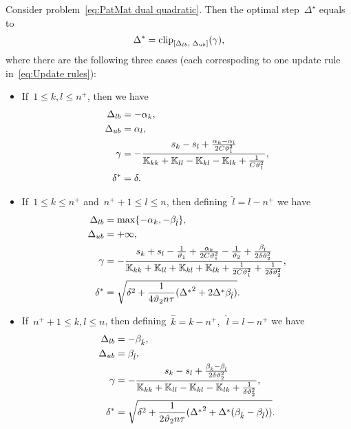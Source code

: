 \begin{theorem}\label{thm:Update rule PatMat with quadratic loss}
  Consider problem~\eqref{eq:PatMat dual quadratic}. Then the optimal step~$\Delta^\star$ equals to
  \begin{equation}\label{eq:Delta_optimal2}
    \Delta^{*} = \clip{\Delta_{lb}}{\Delta_{ub}}{\gamma},
  \end{equation}
  where there are the following three cases (each correspoding to one update rule in~\eqref{eq:Update rules}):
  \begin{itemize}
    \item If~$1\le k, l \le n^+$, then we have
    \begin{align*}
      \Delta_{lb} & = -\alpha_k, \\
      \Delta_{ub} & = \alpha_l, \\
      \gamma      & = -\frac{s_k - s_l + \frac{\alpha_k - \alpha_l}{2C\vartheta_1^2}}{\mathbb{K}_{kk} + \mathbb{K}_{ll} - \mathbb{K}_{kl} - \mathbb{K}_{lk} + \frac{1}{C\vartheta_1^2}}, \\
      \delta^{*}  & = \delta.
    \end{align*}
    \item If~$1 \le k \le n^+$ and~$n^+ + 1 \le l \le n$, then defining~$\hat{l} = l - n^+$ we have
    \begin{align*}
      \Delta_{lb} & = \max\{- \alpha_k, - \beta_{\hat{l}}\}, \\
      \Delta_{ub} & = +\infty, \\
      \gamma      & = -\frac{s_k + s_l  - \frac{1}{\vartheta_1} + \frac{\alpha_k}{2C\vartheta_1^2} - \frac{1}{\vartheta_2} + \frac{\beta_{\hat{l}}}{2\delta\vartheta_2^2}}{\mathbb{K}_{kk} + \mathbb{K}_{ll} + \mathbb{K}_{kl} + \mathbb{K}_{lk} + \frac{1}{2C\vartheta_1^2} + \frac{1}{2\delta\vartheta_2^2}}, \\
      \delta^{*}  & = \sqrt{\delta^2 + \frac{1}{4 \vartheta_2 n \tau}({\Delta^{*}}^2 + 2 \Delta^{*} \beta_{\hat{l}})}.
    \end{align*}
    \item If~$n^+ + 1\le k,l \le n$, then defining~$\hat{k} = k - n^+,$~$\hat{l} = l - n^+$ we have
    \begin{align*}
      \Delta_{lb} & = - \beta_{\hat{k}}, \\
      \Delta_{ub} & = \beta_{\hat{l}}, \\
      \gamma      & = -\frac{s_k - s_l + \frac{\beta_{\hat{k}} - \beta_{\hat{l}}}{2\delta \vartheta_2^2}}{\mathbb{K}_{kk} + \mathbb{K}_{ll} - \mathbb{K}_{kl} - \mathbb{K}_{lk} + \frac{1}{\delta \vartheta_2^2}}, \\
      \delta^{*}  & = \sqrt{\delta^2 + \frac{1}{2 \vartheta_2 n \tau}({\Delta^{*}}^2 + \Delta^{*} (\beta_{\hat{k}} - \beta_{\hat{l}}))}.
    \end{align*}
  \end{itemize}
\end{theorem}

